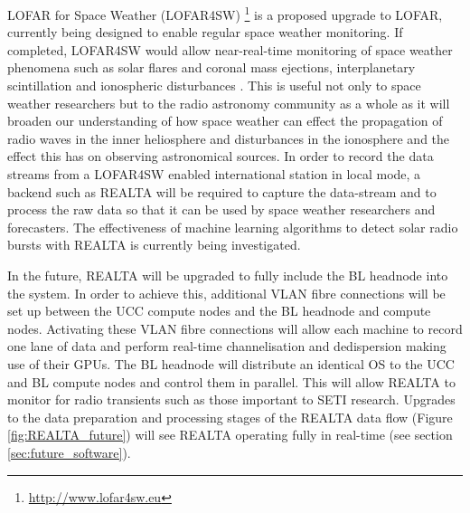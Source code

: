 LOFAR for Space Weather (LOFAR4SW) \footnote{\hyperref[LOFAR4SW]{http://www.lofar4sw.eu}} is a proposed upgrade to LOFAR, currently being designed to enable regular space weather monitoring. If completed, LOFAR4SW would allow near-real-time monitoring of space weather phenomena such as solar flares and coronal mass ejections, interplanetary scintillation and ionospheric disturbances \citep{Carley2020}. This is useful not only to space weather researchers but to the radio astronomy community as a whole as it will broaden our understanding of how space weather can effect the propagation of radio waves in the inner heliosphere and disturbances in the ionosphere and the effect this has on observing astronomical sources. In order to record the data streams from a LOFAR4SW enabled international station in local mode, a backend such as REALTA will be required to capture the data-stream and to process the raw data so that it can be used by space weather researchers and forecasters. The effectiveness of machine learning algorithms to detect solar radio bursts with REALTA is currently being investigated.

In the future, REALTA will be upgraded to fully include the BL headnode into the system. In order to achieve this, additional VLAN fibre connections will be set up between the UCC compute nodes and the BL headnode and compute nodes. Activating these VLAN fibre connections will allow each machine to record one lane of data and perform real-time channelisation and dedispersion making use of their GPUs.  The BL headnode will distribute an identical OS to the UCC and BL compute nodes and control them in parallel. This will allow REALTA to monitor for radio transients such as those important to SETI research. Upgrades to the data preparation and processing stages of the REALTA data flow (Figure \ref{fig:REALTA_future}) will see REALTA operating fully in real-time (see section \ref{sec:future_software}). %

